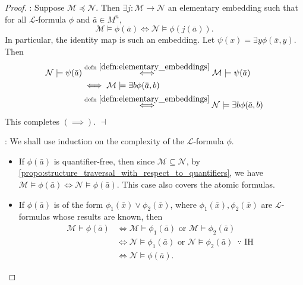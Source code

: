 \documentclass[notoc,notitlepage]{tufte-book}
\begin{document}
\begin{proof}
  : Suppose $\mathcal{M} \preceq \mathcal{N}$. Then $\exists j : \mathcal{M} \to \mathcal{N}$ an elementary embedding such that for all $\mathcal{L}$-formula $\phi$ and $\bar{a} \in M^n$, 
  \begin{equation*}
    \mathcal{M} \models \phi(\bar{a}) \iff \mathcal{N} \models \phi(j(\bar{a})).
  \end{equation*}
  In particular, the identity map is such an embedding. Let $\psi(x) = \exists y \phi(\bar{x}, y)$. Then
  \begin{align*}
    \mathcal{N} \models \psi(\bar{a}) &\overset{\text{defn }\ref{defn:elementary_embeddings}}{\iff} \mathcal{M} \models \psi(\bar{a}) \\
                                      &\iff \mathcal{M} \models \exists b \phi(\bar{a}, b) \\
                                      &\overset{\text{defn }\ref{defn:elementary_embeddings}}{\iff} \mathcal{N} \models \exists b \phi(\bar{a}, b)
  \end{align*}
  This completes $(\implies)$. $\dashv$

  \noindent{}: We shall use induction on the complexity of the $\mathcal{L}$-formula $\phi$. 
  \begin{itemize}
    \item If $\phi(\bar{a})$ is quantifier-free, then since $\mathcal{M} \subseteq \mathcal{N}$, by \cref{propo:structure_traversal_with_respect_to_quantifiers}, we have $\mathcal{M} \models \phi(\bar{a}) \iff \mathcal{N} \models \phi(\bar{a})$. This case also covers the atomic formulas.
      \item If $\phi(\bar{a})$ is of the form $\phi_1(\bar{x}) \lor \phi_2(\bar{x})$, where $\phi_1(\bar{x}), \phi_2(\bar{x})$ are $\mathcal{L}$-formulas whose results are known, then
        \begin{align*}
          \mathcal{M} \models \phi(\bar{a}) &\iff \mathcal{M} \models \phi_1(\bar{a}) \text{ or } \mathcal{M} \models \phi_2(\bar{a}) \\
                                            &\iff \mathcal{N} \models \phi_1(\bar{a}) \text{ or } \mathcal{N} \models \phi_2(\bar{a}) \enspace \because \text{ IH } \\
                                            &\iff \mathcal{N} \models \phi(\bar{a}).
        \end{align*}


\end{itemize}
\end{proof}
\end{document}
